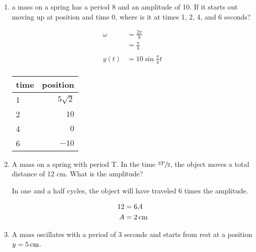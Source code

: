 \documentclass{exam}
\begin{document}
\begin{enumerate}
    \item a mass on a spring has a period 8 and an amplitude of 10.  If it starts out moving up at position and time 0,
      where is it at times 1, 2, 4, and 6 seconds?

      \begin{solution}
        \begin{align*}
          \omega & = \frac{2 \pi}{8} \\
                 & = \frac{\pi}{4} \\
          \\
          y(t)   & = 10 \sin \frac{\pi}{4} t \\
        \end{align*}

        \begin{tabular}[H]{lr}
          \toprule
          time & position \\
          \midrule
          1 & $5 \sqrt{2}$ \\
          2 & $10$ \\
          4 & $0$ \\
          6 & $-10$ \\
          \bottomrule
        \end{tabular}
      \end{solution}

    \item A mass on a spring with period T.  In the time $\sfrac{3T}{2}$, the object moves a total distance of 12 cm.  
      What is the amplitude?

      \begin{solution}
        In one and a half cycles, the object will have traveled 6 times the amplitude.

        \begin{align*}
          12 & = 6 A \\
          A  & = \unit[2]{cm} \\
        \end{align*}
        
      \end{solution}
    \item A mass oscillates with a period of 3 seconds and starts from rest at a position $y = \unit[5]{cm}$.
\end{enumerate}
\end{document}
